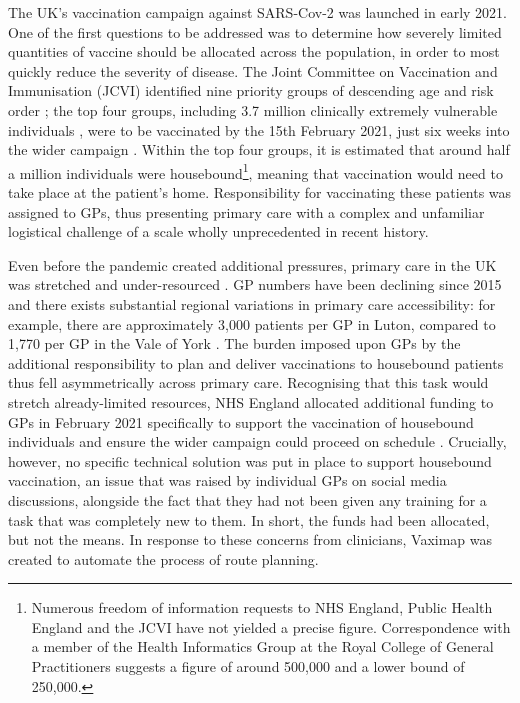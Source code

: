 \documentclass{article}
\def\vm{Vaximap}
\begin{document}
The UK’s vaccination campaign against SARS-Cov-2 was launched in early 2021. One of the first questions to be addressed was to determine how severely limited quantities of vaccine should be allocated across the population, in order to most quickly reduce the severity of disease. The Joint Committee on Vaccination and Immunisation (JCVI) identified nine priority groups of descending age and risk order \cite{JCVI2020}; the top four groups, including 3.7 million clinically extremely vulnerable individuals \cite{ONS_CEV}, were to be vaccinated by the 15th February 2021, just six weeks into the wider campaign \cite{NHSE_uplift}. Within the top four groups, it is estimated that around half a million individuals were housebound\footnote{Numerous freedom of information requests to NHS England, Public Health England and the JCVI have not yielded a precise figure. Correspondence with a member of the Health Informatics Group at the Royal College of General Practitioners suggests a figure of around 500,000 and a lower bound of 250,000.}, meaning that vaccination would need to take place at the patient’s home. Responsibility for vaccinating these patients was assigned to GPs, thus presenting primary care with a complex and unfamiliar logistical challenge of a scale wholly unprecedented in recent history. 

Even before the pandemic created additional pressures, primary care in the UK was stretched and under-resourced \cite{TheKingsFund2020, BritishMedicalAssociation2022}. GP numbers have been declining since 2015 and there exists substantial regional variations in primary care accessibility: for example, there are approximately 3,000 patients per GP in Luton, compared to 1,770 per GP in the Vale of York \cite{caulfieldmariaWrittenQuestionNumber2022, Rolewicz2021}. The burden imposed upon GPs by the additional responsibility to plan and deliver vaccinations to housebound patients thus fell asymmetrically across primary care. Recognising that this task would stretch already-limited resources, NHS England allocated additional funding to GPs in February 2021 specifically to support the vaccination of housebound individuals and ensure the wider campaign could proceed on schedule \cite{NHSE_uplift}. Crucially, however, no specific technical solution was put in place to support housebound vaccination, an issue that was raised by individual GPs on social media discussions, alongside the fact that they had not been given any training for a task that was completely new to them. In short, the funds had been allocated, but not the means. In response to these concerns from clinicians, \vm{} was created to automate the process of route planning.
\end{document}
